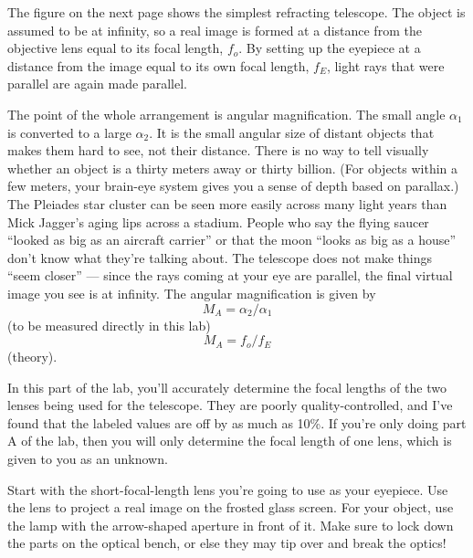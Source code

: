 \label{fig:telescope}

The figure on the next page
shows the simplest refracting telescope. The
object is assumed to be at infinity, so a real image is
formed at a distance from the objective lens equal to its
focal length, $f_o$. By setting up the eyepiece at a
distance from the image equal to its own focal length,
$f_E$, light rays that were parallel are again made parallel.

The point of the whole arrangement is angular magnification.
The small angle $\alpha_1$ is converted to a large
$\alpha_2$. It is the small angular size of distant objects
that makes them hard to see, not their distance. There is no
way to tell visually whether an object is a thirty meters
away or thirty billion. (For objects within a few meters,
your brain-eye system gives you a sense of depth based on
parallax.) The Pleiades star cluster can be seen more easily
across many light years than Mick Jagger's aging lips across
a stadium. People who say the flying saucer ``looked as big
as an aircraft carrier'' or that the moon ``looks as big as
a house'' don't know what they're talking about. The
telescope does not make things ``seem closer'' --- since the
rays coming at your eye are parallel, the final virtual
image you see is at infinity. The angular magnification is given by
\begin{equation*}
      M_A  =  \alpha_2/\alpha_1   
\end{equation*}
(to be measured directly in this lab)
\begin{equation*}
      M_A  =  f_o/f_E   
\end{equation*}
(theory).

\observations

In this part of the lab, you'll accurately determine the focal lengths of the two
lenses being used for the telescope. They are poorly quality-controlled, and I've
found that the labeled values are off by as much as 10\%. If you're only doing
part A of the lab, then you will only determine the focal length of one lens, which is
given to you as an unknown.

Start with the short-focal-length lens you're going to use as your eyepiece.
Use the lens to project a real image on the
frosted glass screen. For your object, use the lamp with the
arrow-shaped aperture in front of it. Make sure to lock down
the parts on the optical bench, or else they may tip over
and break the optics!

